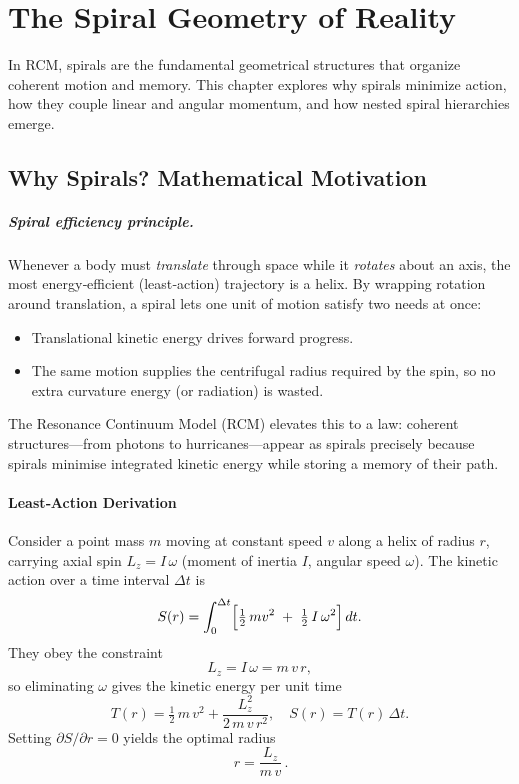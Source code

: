 \chapter{The Spiral Geometry of Reality}

In RCM, spirals are the fundamental geometrical structures that organize coherent motion and memory. This chapter explores why spirals minimize action, how they couple linear and angular momentum, and how nested spiral hierarchies emerge.



\section{Why Spirals? Mathematical Motivation}

\paragraph{Spiral efficiency principle.}  
Whenever a body must \emph{translate} through space while it \emph{rotates} about an axis, the most energy‐efficient (least‐action) trajectory is a helix.  By wrapping rotation around translation, a spiral lets one unit of motion satisfy two needs at once:
\begin{itemize}
  \item Translational kinetic energy drives forward progress.
  \item The same motion supplies the centrifugal radius required by the spin, so no extra curvature energy (or radiation) is wasted.
\end{itemize}
The Resonance Continuum Model (RCM) elevates this to a law: coherent structures—from photons to hurricanes—appear as spirals precisely because spirals minimise integrated kinetic energy while storing a memory of their path.

\subsubsection{Least‐Action Derivation}

Consider a point mass \(m\) moving at constant speed \(v\) along a helix of radius \(r\), carrying axial spin \(L_z=I\,\omega\) (moment of inertia \(I\), angular speed \(\omega\)).  The kinetic action over a time interval \(\Delta t\) is
\[
  S(r)
  = \int_{0}^{\Delta t}
      \Bigl[\tfrac12\,m v^{2} \;+\; \tfrac12\,I\,\omega^{2}\Bigr]\,dt.
\]
They obey the constraint
\[
  L_z = I\,\omega = m\,v\,r,
  \tag{2.1}
\]
so eliminating \(\omega\) gives the kinetic energy per unit time
\[
  T(r)
  = \tfrac12\,m\,v^{2}
    + \frac{L_z^{2}}{2\,m\,v\,r^{2}},
  \quad
  S(r) = T(r)\,\Delta t.
\]
Setting \(\partial S/\partial r=0\) yields the optimal radius
\[
  \boxed{\,r = \frac{L_z}{m\,v}\,}.
  \tag{2.2}
\]


